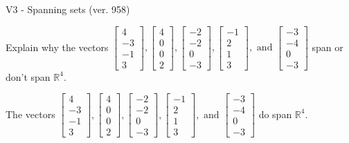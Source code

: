 \begin{exercise}
  \begin{exerciseTitle}V3 - Spanning sets (ver. 958)\end{exerciseTitle}
  \begin{exerciseStatement}
    Explain why the vectors \(\left[\begin{array}{r}
4 \\
-3 \\
-1 \\
3
\end{array}\right] , \left[\begin{array}{r}
4 \\
0 \\
0 \\
2
\end{array}\right] , \left[\begin{array}{r}
-2 \\
-2 \\
0 \\
-3
\end{array}\right] , \left[\begin{array}{r}
-1 \\
2 \\
1 \\
3
\end{array}\right] , \text{ and } \left[\begin{array}{r}
-3 \\
-4 \\
0 \\
-3
\end{array}\right]\) span or don't span \(\mathbb{R}^4\). 
	


  \end{exerciseStatement}
  \begin{exerciseAnswer}
   The vectors \(\left[\begin{array}{r}
4 \\
-3 \\
-1 \\
3
\end{array}\right] , \left[\begin{array}{r}
4 \\
0 \\
0 \\
2
\end{array}\right] , \left[\begin{array}{r}
-2 \\
-2 \\
0 \\
-3
\end{array}\right] , \left[\begin{array}{r}
-1 \\
2 \\
1 \\
3
\end{array}\right] , \text{ and } \left[\begin{array}{r}
-3 \\
-4 \\
0 \\
-3
\end{array}\right]\) 
  	 do  
	span \(\mathbb{R}^4\).
  



\end{exerciseAnswer}
\end{exercise}
